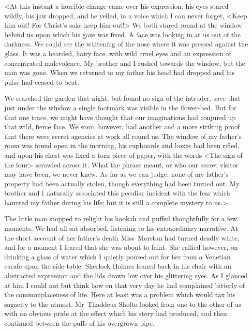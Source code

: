 <At this instant a horrible change came over his expression; his eyes stared wildly, his jaw dropped, and he yelled, in a voice which I can never forget, <Keep him out! For Christ's sake keep him out!> We both stared round at the window behind us upon which his gaze was fixed. A face was looking in at us out of the darkness. We could see the whitening of the nose where it was pressed against the glass. It was a bearded, hairy face, with wild cruel eyes and an expression of concentrated malevolence. My brother and I rushed towards the window, but the man was gone. When we returned to my father his head had dropped and his pulse had ceased to beat.

We searched the garden that night, but found no sign of the intruder, save that just under the window a single footmark was visible in the flower-bed. But for that one trace, we might have thought that our imaginations had conjured up that wild, fierce face. We soon, however, had another and a more striking proof that there were secret agencies at work all round us. The window of my father's room was found open in the morning, his cupboards and boxes had been rifled, and upon his chest was fixed a torn piece of paper, with the words <The sign of the four> scrawled across it. What the phrase meant, or who our secret visitor may have been, we never knew. As far as we can judge, none of my father's property had been actually stolen, though everything had been turned out. My brother and I naturally associated this peculiar incident with the fear which haunted my father during his life; but it is still a complete mystery to us.>

The little man stopped to relight his hookah and puffed thoughtfully for a few moments. We had all sat absorbed, listening to his extraordinary narrative. At the short account of her father's death Miss~Morstan had turned deadly white, and for a moment I feared that she was about to faint. She rallied however, on drinking a glass of water which I quietly poured out for her from a Venetian carafe upon the side-table. Sherlock Holmes leaned back in his chair with an abstracted expression and the lids drawn low over his glittering eyes. As I glanced at him I could not but think how on that very day he had complained bitterly of the commonplaceness of life. Here at least was a problem which would tax his sagacity to the utmost. Mr~Thaddeus Sholto looked from one to the other of us with an obvious pride at the effect which his story had produced, and then continued between the puffs of his overgrown pipe.

